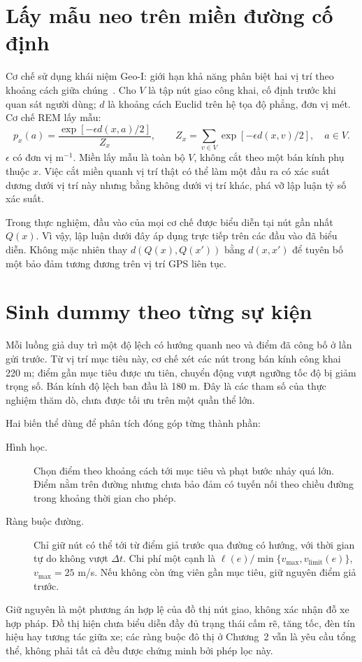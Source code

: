 \section{Lấy mẫu neo trên miền đường cố định}

Cơ chế sử dụng khái niệm Geo-I: giới hạn khả năng phân biệt hai vị trí theo khoảng cách giữa chúng~\cite{andres2013geoi}. Cho $V$ là tập nút giao công khai, cố định trước khi quan sát người dùng; $d$ là khoảng cách Euclid trên hệ tọa độ phẳng, đơn vị mét. Cơ chế REM lấy mẫu:
\begin{equation}
 p_x(a)=\frac{\exp[-\epsilon d(x,a)/2]}{Z_x},\qquad
 Z_x=\sum_{v\in V}\exp[-\epsilon d(x,v)/2],\quad a\in V.
 \label{eq:report-anchor}
\end{equation}
$\epsilon$ có đơn vị $\mathrm{m}^{-1}$. Miền lấy mẫu là toàn bộ $V$, không cắt theo một bán kính phụ thuộc $x$. Việc cắt miền quanh vị trí thật có thể làm một đầu ra có xác suất dương dưới vị trí này nhưng bằng không dưới vị trí khác, phá vỡ lập luận tỷ số xác suất.

Trong thực nghiệm, đầu vào của mọi cơ chế được biểu diễn tại nút gần nhất $Q(x)$. Vì vậy, lập luận dưới đây áp dụng trực tiếp trên các đầu vào đã biểu diễn. Không mặc nhiên thay $d(Q(x),Q(x'))$ bằng $d(x,x')$ để tuyên bố một bảo đảm tương đương trên vị trí GPS liên tục.

\section{Sinh dummy theo từng sự kiện}

Mỗi luồng giả duy trì một độ lệch có hướng quanh neo và điểm đã công bố ở lần gửi trước. Từ vị trí mục tiêu này, cơ chế xét các nút trong bán kính công khai 220 m; điểm gần mục tiêu được ưu tiên, chuyển động vượt ngưỡng tốc độ bị giảm trọng số. Bán kính độ lệch ban đầu là 180 m. Đây là các tham số của thực nghiệm thăm dò, chưa được tối ưu trên một quần thể lớn.

Hai biến thể dùng để phân tích đóng góp từng thành phần:
\begin{description}
 \item[Hình học.] Chọn điểm theo khoảng cách tới mục tiêu và phạt bước nhảy quá lớn. Điểm nằm trên đường nhưng chưa bảo đảm có tuyến nối theo chiều đường trong khoảng thời gian cho phép.
 \item[Ràng buộc đường.] Chỉ giữ nút có thể tới từ điểm giả trước qua đường có hướng, với thời gian tự do không vượt $\Delta t$. Chi phí một cạnh là $\ell(e)/\min\{v_{\max},v_{\mathrm{limit}}(e)\}$, $v_{\max}=25$ m/s. Nếu không còn ứng viên gần mục tiêu, giữ nguyên điểm giả trước.
\end{description}
Giữ nguyên là một phương án hợp lệ của đồ thị nút giao, không xác nhận đỗ xe hợp pháp. Đồ thị hiện chưa biểu diễn đầy đủ trạng thái cấm rẽ, tăng tốc, đèn tín hiệu hay tương tác giữa xe; các ràng buộc đô thị ở Chương~2 vẫn là yêu cầu tổng thể, không phải tất cả đều được chứng minh bởi phép lọc này.

